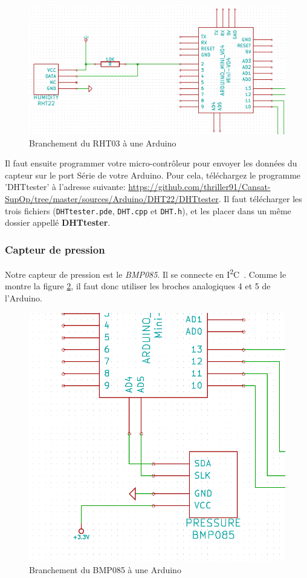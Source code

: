 \documentclass[twocolumn, 8pt]{article}
\newcommand\IdC{I\textsuperscript{2}C~}
\begin{document}
\begin{figure}[!h]
	\centering
	\includegraphics[scale=.2]{RHT03.png}
	\caption{Branchement du RHT03 à une Arduino}
	\label{RHT03}
\end{figure}

\par Il faut ensuite programmer votre micro-contrôleur pour envoyer les données du capteur sur le port Série de votre Arduino. Pour cela, téléchargez le programme \textsf{'DHTtester'} à l'adresse suivante: \url{https://github.com/thriller91/Cansat-SupOp/tree/master/sources/Arduino/DHT22/DHTtester}. Il faut télécharger les trois fichiers (\texttt{DHTtester.pde}, \texttt{DHT.cpp} et \texttt{DHT.h}), et les placer dans un même dossier appellé \textbf{DHTtester}.

\subsubsection{Capteur de pression}
\par Notre capteur de pression est le \emph{BMP085}. Il se connecte en \IdC. Comme le montre la figure \ref{BMP085}, il faut donc utiliser les broches analogiques \no{}4 et 5 de l'Arduino.

\begin{figure}[!h]
	\centering
	\includegraphics[scale=.2]{BMP085.png}
	\caption{Branchement du BMP085 à une Arduino}
	\label{BMP085}
\end{figure}
\end{document}
